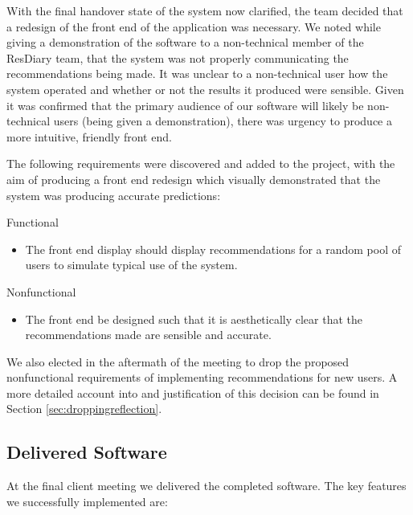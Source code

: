 \documentclass{l3proj}
\begin{document}
With the final handover state of the system now clarified, the team decided that a redesign of the front end of the application was necessary. We noted while giving a demonstration of the software to a non-technical member of the ResDiary team, that the system was not properly communicating the recommendations being made. It was unclear to a non-technical user how the system operated and whether or not the results it produced were sensible. Given it was confirmed that the primary audience of our software will likely be non-technical users (being given a demonstration), there was urgency to produce a more intuitive, friendly front end. 

The following requirements were discovered and added to the project, with the aim of producing a front end redesign which visually demonstrated that the system was producing accurate predictions:

Functional
\begin{itemize}
\item The front end display should display recommendations for a random pool of users to simulate typical use of the system.
\end{itemize}

Nonfunctional
\begin{itemize}
\item The front end be designed such that it is aesthetically clear that the recommendations made are sensible and accurate.
\end{itemize}

We also elected in the aftermath of the meeting to drop the proposed nonfunctional requirements of implementing recommendations for new users. A more detailed account into and justification of this decision can be found in Section \ref{sec:droppingreflection}.

\subsection{Delivered Software}
\label{sec:finsoftware}

At the final client meeting we delivered the completed software. The key features we successfully implemented are:
\end{document}
